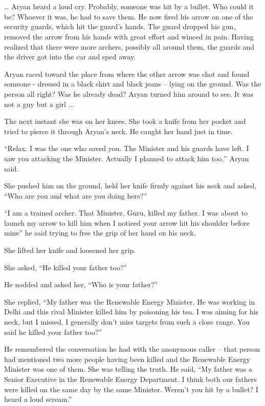 \chapter{}

… Aryan heard a loud cry. Probably, someone was hit by a bullet. Who could it
be? Whoever it was, he had to save them. He now fired his arrow on one of the
security guards, which hit the guard's hands. The guard dropped his gun, removed
the arrow from his hands with great effort and winced in pain. Having realized
that there were more archers, possibly all around them, the guards and the
driver got into the car and sped away.

Aryan raced toward the place from where the other arrow was shot and found
someone - dressed in a black shirt and black jeans – lying on the ground. Was
the person all right? Was he already dead? Aryan turned him around to see. It
was not a guy but a girl ...

The next instant she was on her knees. She took a knife from her pocket and
tried to pierce it through Aryan's neck. He caught her hand just in time.

“Relax. I was the one who saved you. The Minister and his guards have left. I
saw you attacking the Minister. Actually I planned to attack him too,” Aryan
said.

She pushed him on the ground, held her knife firmly against his neck and asked,
“Who are you and what are you doing here?”

“I am a trained archer. That Minister, Guru, killed my father. I was about to
launch my arrow to kill him when I noticed your arrow hit his shoulder before
mine” he said trying to free the grip of her hand on his neck.

She lifted her knife and loosened her grip.

She asked, “He killed your father too?”

He nodded and asked her, “Who is your father?”

She replied, “My father was the Renewable Energy Minister. He was working in
Delhi and this rival Minister killed him by poisoning his tea. I was aiming for
his neck, but I missed. I generally don't miss targets from such a close range.
You said he killed your father too?”

He remembered the conversation he had with the anonymous caller – that person
had mentioned two more people having been killed and the Renewable Energy
Minister was one of them. She was telling the truth. He said, “My father was a
Senior Executive in the Renewable Energy Department. I think both our fathers
were killed on the same day by the same Minister. Weren't you hit by a bullet? I
heard a loud scream.”

